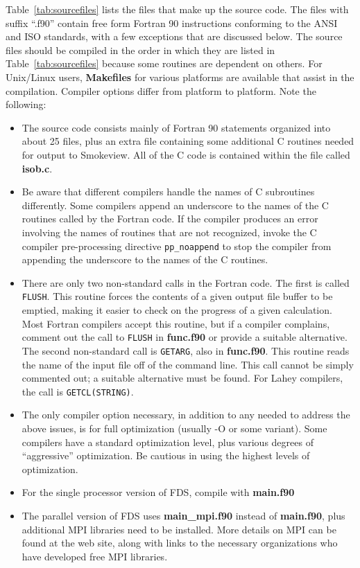 \documentclass[11pt]{book}
\newcommand{\ct}{\tt\small}
\begin{document}
Table~\ref{tab:sourcefiles} lists the files that make up the source code.
The files with suffix ``.f90'' contain free form Fortran 90
instructions conforming to the ANSI and ISO standards, with a few exceptions that are discussed below.
The source files should be compiled in the order in which they are listed
in Table~\ref{tab:sourcefiles} because some routines are dependent on others.
For Unix/Linux users, {\bf Makefiles} for various platforms are available that assist in the
compilation. Compiler options differ from platform to platform.
Note the following:
\begin{itemize}
\item The source code consists mainly of Fortran 90
statements organized into about 25 files, plus an extra file containing
some additional C routines needed for output to Smokeview.
All of the C code is contained within the file called {\bf isob.c}.
\item Be aware that different
compilers handle the names of C subroutines differently. Some compilers
append an underscore to the names of the C routines called by the Fortran
code. If the compiler produces an error involving the names of routines
that are not recognized, invoke the C compiler pre-processing directive {\ct pp\_noappend} to stop
the compiler from appending the underscore to the names of the C routines.
\item There are only two non-standard calls in the Fortran code. The first is called
{\ct FLUSH}. This routine forces the contents of a given output
file buffer to be emptied, making it easier to check on
the progress of a given calculation. Most Fortran compilers accept this
routine, but if a compiler complains, comment out the call to {\ct FLUSH} in {\bf func.f90} or provide a suitable alternative.
The second non-standard call is {\ct GETARG}, also in {\bf func.f90}. This routine reads the name of the input file off of the command line. This call cannot
be simply commented out; a suitable alternative must be found. For Lahey compilers, the call is {\ct GETCL(STRING)}.
\item The only compiler option necessary, in addition to any needed to
address the above issues, is for full optimization (usually -O or some variant). Some
compilers have a standard optimization level, plus various degrees of
``aggressive'' optimization. Be cautious in using the highest levels of optimization.
\item For the single processor version of FDS, compile with {\bf main.f90}
\item The parallel version of FDS uses {\bf main\_mpi.f90} instead of
{\bf main.f90}, plus additional MPI libraries need to be installed. More details on MPI can be found at the web site, along with links to the
necessary organizations who have developed free MPI libraries.
\end{itemize}
\end{document}
